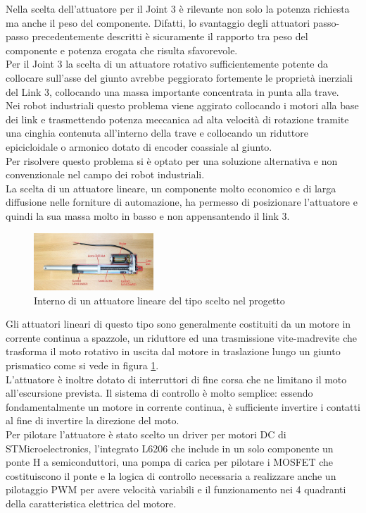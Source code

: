 \documentclass[%
corpo=11pt,
twoside,
 stile=classica,
oldstyle,
greek,%
]{toptesi}
\begin{document}
	Nella scelta dell'attuatore per il Joint 3 è rilevante non solo la potenza richiesta ma anche il peso del componente. Difatti, lo svantaggio degli attuatori passo-passo precedentemente descritti è sicuramente il rapporto tra peso del componente e potenza erogata che risulta sfavorevole.\\
	Per il Joint 3 la scelta di un attuatore rotativo sufficientemente potente da collocare sull'asse del giunto avrebbe peggiorato fortemente le proprietà inerziali del Link 3, collocando una massa importante concentrata in punta alla trave. \\
	Nei robot industriali questo problema viene aggirato collocando i motori alla base dei link e trasmettendo potenza meccanica ad alta velocità di rotazione tramite una cinghia contenuta all'interno della trave e collocando un riduttore epicicloidale o armonico dotato di encoder coassiale al giunto. \\
	Per risolvere questo problema si è optato per una soluzione alternativa e non convenzionale nel campo dei robot industriali. 
	\\
	La scelta di un attuatore lineare, un componente molto economico e di larga diffusione nelle forniture di automazione, ha permesso di posizionare l'attuatore e quindi la sua massa molto in basso e non appensantendo il link 3. \\
		\begin{figure}
		\centering
		\includegraphics[width=0.4\textwidth]{image/linearact.jpg}
		\caption{Interno di un attuatore lineare del tipo scelto nel progetto }
		\label{fig:linearact}
	\end{figure}
	Gli attuatori lineari di questo tipo sono generalmente costituiti da un motore in corrente continua a spazzole, un riduttore ed una trasmissione vite-madrevite che trasforma il moto rotativo in uscita dal motore in traslazione lungo un giunto prismatico come si vede in figura \ref{fig:linearact}.\\
	L'attuatore è inoltre dotato di interruttori di fine corsa che ne limitano il moto all'escursione prevista. Il sistema di controllo è molto semplice: essendo fondamentalmente un motore in corrente continua, è sufficiente invertire i contatti al fine di invertire la direzione del moto.\\ 
	Per pilotare l'attuatore è stato scelto un driver per motori DC di STMicroelectronics, l'integrato L6206 che include in un solo componente un ponte H a semiconduttori, una pompa di carica per pilotare i MOSFET che costituiscono il ponte e la logica di controllo necessaria a realizzare anche un pilotaggio PWM per avere velocità variabili e il funzionamento nei 4 quadranti della caratteristica elettrica del motore. 
	
\end{document}

